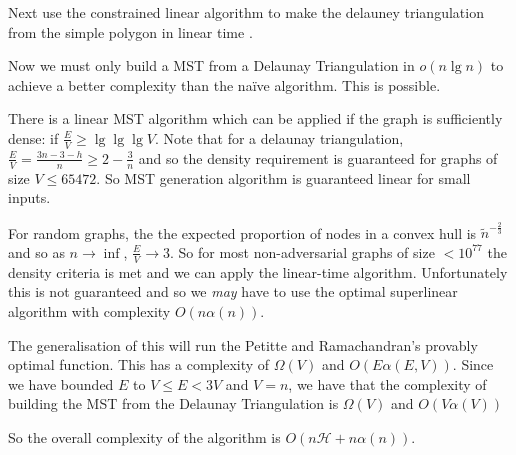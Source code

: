 \documentclass[10pt,\jkfside,a4paper]{article}
\begin{document}
\begin{enumerate}
\begin{enumerate}
Next use the constrained linear algorithm to make the delauney triangulation from the simple polygon 
in linear time \cite{lineardelaunay}. 

Now we must only build a MST from a Delaunay Triangulation in $o(n\lg n)$ to achieve a better complexity 
than the na\"ive algorithm. This is possible.

There is a linear MST algorithm which can be applied if the graph is sufficiently dense: if 
$\frac{E}{V} \geq \lg \lg \lg V$. Note that for a delaunay triangulation, 
$\frac{E}{V} = \frac{3n - 3 - h}{n} \geq 2 - \frac{3}{n}$ and so the density requirement is guaranteed 
for graphs of size $V \leq 65472$. So MST generation algorithm is guaranteed linear for small inputs.

For random graphs, the the expected proportion of nodes in a convex hull is $\tilde n^{-\frac{2}{3}}$ 
\cite{minhull} and so as $n\longrightarrow \inf$, $\frac{E}{V} \longrightarrow 3$. So for most non-adversarial 
graphs of size $< 10^{77}$ the density criteria is met and we can apply the linear-time algorithm. Unfortunately 
this is not guaranteed and so we \textit{may} have to use the optimal superlinear algorithm with complexity 
$O(n\alpha(n))$.

The generalisation of this will run the Petitte and Ramachandran's provably optimal function. This has 
a complexity of $\Omega(V)$ and $O(E\alpha(E, V))$. Since we have bounded $E$ to $V \leq E < 3V$ and $V = n$, 
we have that the complexity of building the MST from the Delaunay Triangulation is $\Omega(V)$ and $O(V\alpha(V))$

So the overall complexity of the algorithm is $O(n\mathcal{H} + n\alpha(n))$.

\end{enumerate}

\end{enumerate}



\end{document}
